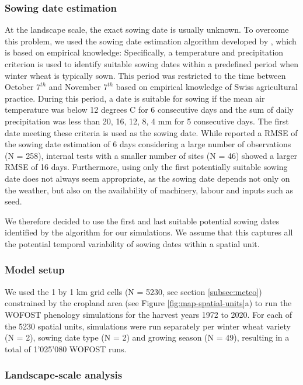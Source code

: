 \subsubsection{Sowing date estimation}
\label{subsubsec:sowing-date-estimation}
At the landscape scale, the exact sowing date is usually unknown. To overcome this problem, we used the sowing date estimation algorithm developed by \cite{holzkamper_spatial_2015}, which is based on empirical knowledge: Specifically, a temperature and precipitation criterion is used to identify suitable sowing dates within a predefined period when winter wheat is typically sown. This period was restricted to the time between October $7^{th}$ and November $7^{th}$ based on empirical knowledge of Swiss agricultural practice. During this period, a date is suitable for sowing if the mean air temperature was below 12 degrees C for 6 consecutive days and the sum of daily precipitation was less than 20, 16, 12, 8, 4 mm for 5 consecutive days. The first date meeting these criteria is used as the sowing date. While \cite{holzkamper_spatial_2015} reported a \gls{RMSE} of the sowing date estimation of 6 days considering a large number of observations (N = 258), internal tests with a smaller number of sites (N = 46) showed a larger \gls{RMSE} of 16 days. Furthermore, using only the first potentially suitable sowing date does not always seem appropriate, as the sowing date depends not only on the weather, but also on the availability of machinery, labour and inputs such as seed.

We therefore decided to use the first and last suitable potential sowing dates identified by the algorithm for our simulations. We assume that this captures all the potential temporal variability of sowing dates within a spatial unit.

\subsubsection{Model setup}
We used the 1 by 1 km grid cells (N = 5230, see section \ref{subsec:meteo}) constrained by the cropland area (see Figure \ref{fig:map-spatial-units}a) to run the \gls{WOFOST} phenology simulations for the harvest years 1972 to 2020. For each of the 5230 spatial units, simulations were run separately per winter wheat variety (N = 2), sowing date type (N = 2) and growing season (N = 49), resulting in a total of 1'025'080 \gls{WOFOST} runs.

\subsubsection{Landscape-scale analysis}

